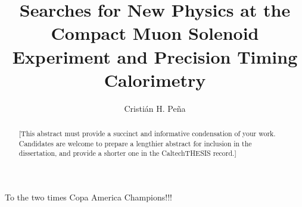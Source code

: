 \documentclass[12pt]{caltech_thesis}
\begin{document}
\title{Searches for New Physics at the Compact
Muon Solenoid Experiment and Precision Timing Calorimetry}
\author{Cristi\'an H. Pe\~na}

\address{Pasadena, California}                     %



\maketitle[logo]

\begin{acknowledgements} 	 
  To the two times Copa America Champions!!!
\end{acknowledgements}

\begin{abstract}
   [This abstract must provide a succinct and informative condensation of your work. Candidates are welcome to prepare a lengthier abstract for inclusion in the dissertation, and provide a shorter one in the CaltechTHESIS record.]
\end{abstract}

\begin{publishedcontent}%
\nocite{Cahn:etal:2015}
\end{publishedcontent}
\end{document}
